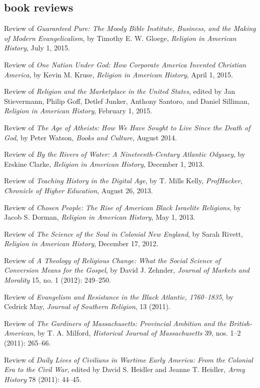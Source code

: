 \documentclass[11pt]{article}
\begin{document}
\subsection{book reviews}\label{book-reviews}

Review of \emph{Guaranteed Pure: The Moody Bible Institute, Business, and the 
  Making of Modern Evangelicalism}, by Timothy E. W. Gloege, \emph{Religion in 
  American History}, July 1, 2015.

Review of \emph{One Nation Under God: How Corporate America Invented Christian 
  America}, by Kevin M. Kruse, \emph{Religion in American History}, April 1, 
2015.

Review of \emph{Religion and the Marketplace in the United States},
edited by Jan Stievermann, Philip Goff, Detlef Junker, Anthony Santoro,
and Daniel Silliman, \emph{Religion in American History}, February 1,
2015.

Review of \emph{The Age of Atheists: How We Have Sought to Live Since
the Death of God}, by Peter Watson, \emph{Books and Culture}, August
2014.

Review of \emph{By the Rivers of Water: A Nineteenth-Century Atlantic
Odyssey}, by Erskine Clarke, \emph{Religion in American History},
December 1, 2013.

Review of \emph{Teaching History in the Digital Age}, by T. Mills Kelly,
\emph{ProfHacker}, \emph{Chronicle of Higher Education}, August 26,
2013.

Review of \emph{Chosen People: The Rise of American Black Israelite
Religions}, by Jacob S. Dorman, \emph{Religion in American History}, May
1, 2013.

Review of \emph{The Science of the Soul in Colonial New England}, by
Sarah Rivett, \emph{Religion in American History}, December 17, 2012.

Review of \emph{A Theology of Religious Change: What the Social Science
of Conversion Means for the Gospel}, by David J. Zehnder, \emph{Journal
of Markets and Morality} 15, no. 1 (2012): 249--250.

Review of \emph{Evangelism and Resistance in the Black Atlantic,
1760--1835}, by Cedrick May, \emph{Journal of Southern Religion}, 13
(2011).

Review of \emph{The Gardiners of Massachusetts: Provincial Ambition and
the British-American}, by T. A. Milford, \emph{Historical Journal of
Massachusetts} 39, nos. 1--2 (2011): 265--66.

Review of \emph{Daily Lives of Civilians in Wartime Early America: From
the Colonial Era to the Civil War}, edited by David S. Heidler and
Jeanne T. Heidler, \emph{Army History} 78 (2011): 44--45.
\end{document}
